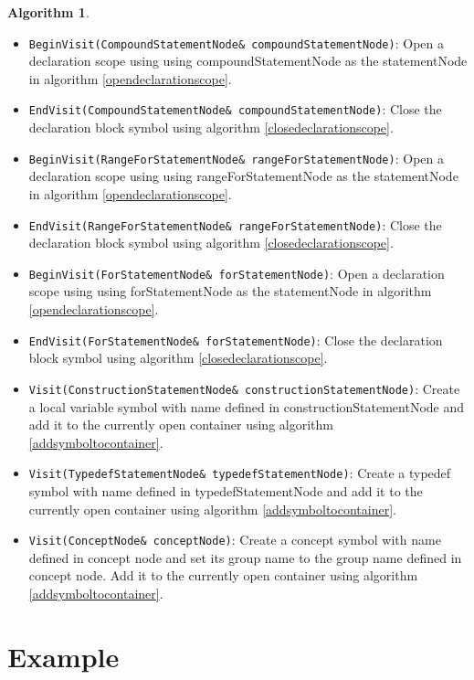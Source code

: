 \documentclass[a4paper,oneside,11pt]{book}
\theoremstyle{definition}
\newtheorem{algo}{Algorithm}[section]
\begin{document}
\begin{algo}
\begin{itemize}
\item
\verb|BeginVisit(CompoundStatementNode& compoundStatementNode)|:
Open a declaration scope using using compoundStatementNode as the statementNode in algorithm \ref{opendeclarationscope}.
\item
\verb|EndVisit(CompoundStatementNode& compoundStatementNode)|:
Close the declaration block symbol using algorithm \ref{closedeclarationscope}.
\item
\verb|BeginVisit(RangeForStatementNode& rangeForStatementNode)|:
Open a declaration scope using using rangeForStatementNode as the statementNode in algorithm \ref{opendeclarationscope}.
\item
\verb|EndVisit(RangeForStatementNode& rangeForStatementNode)|:
Close the declaration block symbol using algorithm \ref{closedeclarationscope}.
\item
\verb|BeginVisit(ForStatementNode& forStatementNode)|:
Open a declaration scope using using forStatementNode as the statementNode in algorithm \ref{opendeclarationscope}.
\item
\verb|EndVisit(ForStatementNode& forStatementNode)|:
Close the declaration block symbol using algorithm \ref{closedeclarationscope}.
\item
\verb|Visit(ConstructionStatementNode& constructionStatementNode)|:
Create a local variable symbol with name defined in constructionStatementNode and
add it to the currently open container using algorithm \ref{addsymboltocontainer}.
\item
\verb|Visit(TypedefStatementNode& typedefStatementNode)|:
Create a typedef symbol with name defined in typedefStatementNode and
add it to the currently open container using algorithm \ref{addsymboltocontainer}.
\item
\verb|Visit(ConceptNode& conceptNode)|:
Create a concept symbol with name defined in concept node and
set its group name to the group name defined in concept node.
Add it to the currently open container using algorithm \ref{addsymboltocontainer}.
\end{itemize}
\end{algo}

\section{Example}
\end{document}
